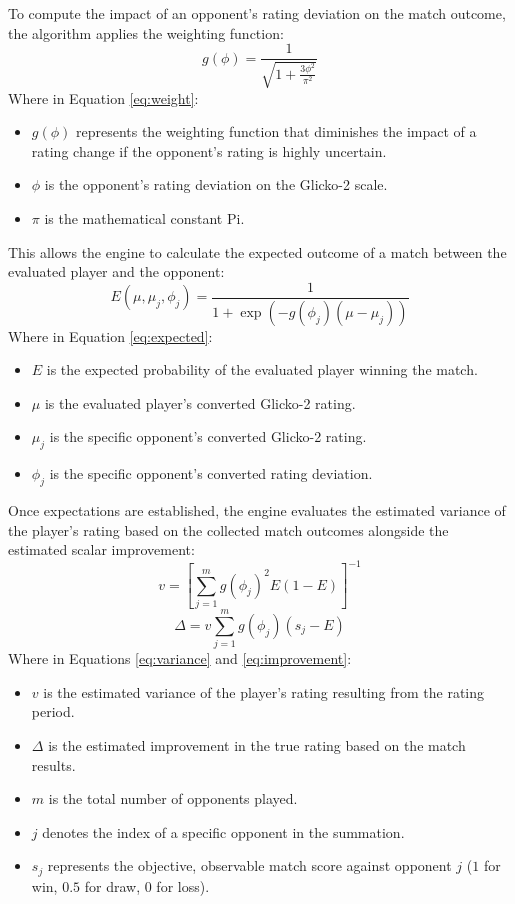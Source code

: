 \documentclass[12pt,a4paper]{report}
\begin{document}
To compute the impact of an opponent's rating deviation on the match outcome, the algorithm applies the weighting function:
\begin{equation} \label{eq:weight}
    g(\phi) = \frac{1}{\sqrt{1 + \frac{3\phi^2}{\pi^2}}}
\end{equation}
Where in Equation \ref{eq:weight}:
\begin{itemize}
    \item $g(\phi)$ represents the weighting function that diminishes the impact of a rating change if the opponent's rating is highly uncertain.
    \item $\phi$ is the opponent's rating deviation on the Glicko-2 scale.
    \item $\pi$ is the mathematical constant Pi.
\end{itemize}

This allows the engine to calculate the expected outcome of a match between the evaluated player and the opponent:
\begin{equation} \label{eq:expected}
    E(\mu, \mu_j, \phi_j) = \frac{1}{1 + \exp(-g(\phi_j)(\mu - \mu_j))}
\end{equation}
Where in Equation \ref{eq:expected}:
\begin{itemize}
    \item $E$ is the expected probability of the evaluated player winning the match.
    \item $\mu$ is the evaluated player's converted Glicko-2 rating.
    \item $\mu_j$ is the specific opponent's converted Glicko-2 rating.
    \item $\phi_j$ is the specific opponent's converted rating deviation.
\end{itemize}

Once expectations are established, the engine evaluates the estimated variance of the player's rating based on the collected match outcomes alongside the estimated scalar improvement:
\begin{equation} \label{eq:variance}
    v = \left[ \sum_{j=1}^{m} g(\phi_j)^2 E(1 - E) \right]^{-1}
\end{equation}
\begin{equation} \label{eq:improvement}
    \Delta = v \sum_{j=1}^{m} g(\phi_j)(s_j - E)
\end{equation}
Where in Equations \ref{eq:variance} and \ref{eq:improvement}:
\begin{itemize}
    \item $v$ is the estimated variance of the player's rating resulting from the rating period.
    \item $\Delta$ is the estimated improvement in the true rating based on the match results.
    \item $m$ is the total number of opponents played.
    \item $j$ denotes the index of a specific opponent in the summation.
    \item $s_j$ represents the objective, observable match score against opponent $j$ ($1$ for win, $0.5$ for draw, $0$ for loss).
\end{itemize}
\end{document}
